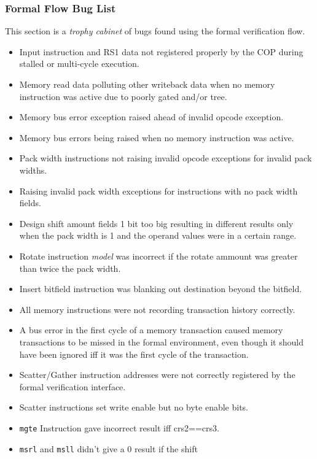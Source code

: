 \subsubsection{Formal Flow Bug List}

This section is a {\em trophy cabinet} of bugs found using the formal
verification flow.

\begin{itemize}
\item Input instruction and RS1 data not registered properly by the COP during
    stalled or multi-cycle execution.
\item Memory read data polluting other writeback data when no memory
    instruction was active due to poorly gated and/or tree.
\item Memory bus error exception raised ahead of invalid opcode exception.
\item Memory bus errors being raised when no memory instruction was active.
\item Pack width instructions not raising invalid opcode exceptions for
    invalid pack widths.
\item Raising invalid pack width exceptions for instructions with no pack
    width fields.
\item Design shift amount fields 1 bit too big resulting in different results
    only when the pack width is 1 and the operand values were in a certain
    range.
\item Rotate instruction {\em model} was incorrect if the rotate ammount was
    greater than twice the pack width.
\item Insert bitfield instruction was blanking out destination beyond the
    bitfield.
\item All memory instructions were not recording transaction history correctly.
\item A bus error in the first cycle of a memory transaction caused memory
    transactions to be missed in the formal environment, even though it
    should have been ignored iff it was the first cycle of the transaction.
\item Scatter/Gather instruction addresses were not correctly registered
    by the formal verification interface.
\item Scatter instructions set write enable but no byte enable bits.
\item {\tt mgte} Instruction gave incorrect result iff crs2==crs3.
\item {\tt msrl} and {\tt msll} didn't give a 0 result if the shift

\end{itemize}

